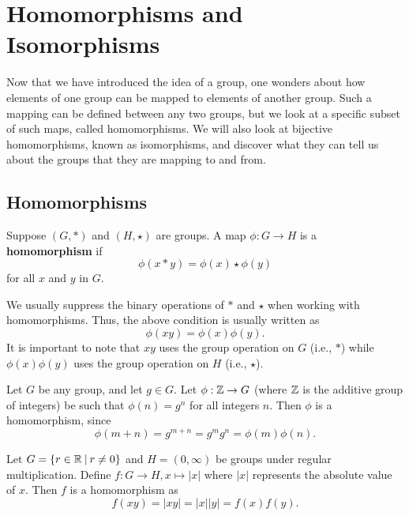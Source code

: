 \chapter{Homomorphisms and Isomorphisms}
Now that we have introduced the idea of a group, one wonders about how elements of one group can be mapped to elements of another group. Such a mapping can be defined between any two groups, but we look at a specific subset of such maps, called homomorphisms. We will also look at bijective homomorphisms, known as isomorphisms, and discover what they can tell us about the groups that they are mapping to and from.

\section{Homomorphisms}
\begin{definition}
    Suppose $(G, \ast)$ and $(H, \star)$ are groups. A map $\phi: G \to H$ is a \textbf{homomorphism} if
    \[
        \phi(x \ast y) = \phi(x) \star \phi(y)
    \]
    for all $x$ and $y$ in $G$.
\end{definition}
\begin{remark}
    We usually suppress the binary operations of $\ast$ and $\star$ when working with homomorphisms. Thus, the above condition is usually written as
    \[
        \phi(xy) = \phi(x)\phi(y).
    \]
    It is important to note that $xy$ uses the group operation on $G$ (i.e., $\ast$) while $\phi(x)\phi(y)$ uses the group operation on $H$ (i.e., $\star$).
\end{remark}

\begin{example}
    Let $G$ be any group, and let $g \in G$. Let $\phi: \mathbb{Z} \to G$ (where $\mathbb{Z}$ is the additive group of integers) be such that $\phi(n) = g^n$ for all integers $n$. Then $\phi$ is a homomorphism, since
    \[
        \phi(m + n) = g^{m+n} = g^m g^n = \phi(m)\phi(n).
    \]
\end{example}

\begin{example}
    Let $G = \{r \in \R \vert r \neq 0\}$ and $H = (0, \infty)$ be groups under regular multiplication. Define $f: G \to H, x \mapsto |x|$ where $|x|$ represents the absolute value of $x$. Then $f$ is a homomorphism as
    \[
        f(xy) = |xy| = |x||y| = f(x)f(y).
    \]
\end{example}

